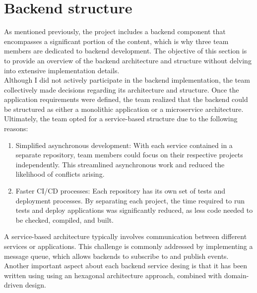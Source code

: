 \documentclass[./chapters/design.tex]{subfiles}
\begin{document}
\section{Backend structure}
As mentioned previously, the project includes a backend component that
encompasses a significant portion of the content, which is why three team
members are dedicated to backend development. The objective of this section is
to provide an overview of the backend architecture and structure without delving
into extensive implementation details.
\\
Although I did not actively participate in the backend implementation, the team
collectively made decisions regarding its architecture and structure. Once the
application requirements were defined, the team realized that the backend could
be structured as either a monolithic application or a microservice architecture.
Ultimately, the team opted for a service-based structure due to the following
reasons:
\\
\begin{enumerate}[label = -]
	\item Simplified asynchronous development: With each service contained in a
	      separate repository, team members could focus on their respective projects
	      independently. This streamlined asynchronous work and reduced the
	      likelihood of conflicts arising.
	\item Faster CI/CD processes: Each repository has its own set of tests and
	      deployment processes. By separating each project, the time required to run
	      tests and deploy applications was significantly reduced, as less code
	      needed to be checked, compiled, and built.
\end{enumerate}
A service-based architecture typically involves communication between different
services or applications. This challenge is commonly addressed by implementing a
message queue, which allows backends to subscribe to and publish events.
\\[8pt]
Another important aspect about each backend service desing is that it has been
written using using an hexagonal architecture approach, combined with
domain-driven design.
\end{document}
